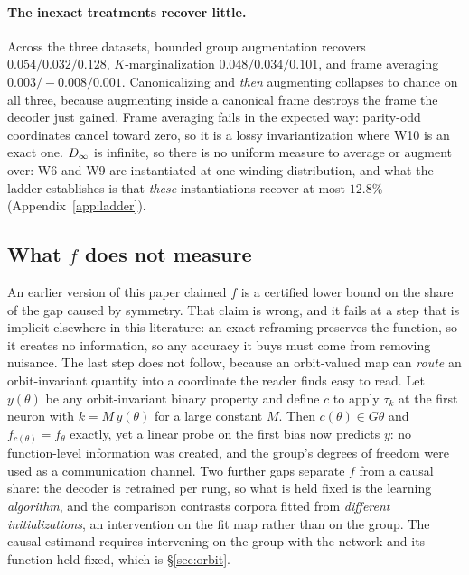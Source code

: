 \paragraph{The inexact treatments recover little.} Across the three datasets, bounded group
augmentation recovers $0.054 / 0.032 / 0.128$, $K$-marginalization $0.048 / 0.034 / 0.101$, and
frame averaging $0.003 / -0.008 / 0.001$. Canonicalizing and \emph{then} augmenting collapses to
chance on all three, because augmenting inside a canonical frame destroys the frame the decoder just
gained. Frame averaging fails in the expected way: parity-odd coordinates cancel toward zero, so it
is a lossy invariantization where W10 is an exact one. $D_\infty$ is infinite, so there is no uniform measure to average or augment over: W6 and W9 are
instantiated at one winding distribution, and what the ladder establishes is that \emph{these}
instantiations recover at most $12.8\%$ (Appendix~\ref{app:ladder}).

\subsection{What \texorpdfstring{$f$}{f} does not measure}\label{sec:bounds}

An earlier version of this paper claimed $f$ is a certified lower bound on the share of the gap
caused by symmetry. That claim is wrong, and it fails at a step that is implicit elsewhere in this
literature: an exact reframing preserves the function, so it creates no information, so any accuracy
it buys must come from removing nuisance. The last step does not follow, because an orbit-valued map
can \emph{route} an orbit-invariant quantity into a coordinate the reader finds easy to read. Let
$y(\theta)$ be any orbit-invariant binary property and define $c$ to apply $\tau_k$ at the first
neuron with $k = M\,y(\theta)$ for a large constant $M$. Then $c(\theta) \in G\theta$ and
$f_{c(\theta)} = f_\theta$ exactly, yet a linear probe on the first bias now predicts $y$: no
function-level information was created, and the group's degrees of freedom were used as a
communication channel. Two further gaps separate $f$ from a causal share: the decoder is retrained per rung, so what is
held fixed is the learning \emph{algorithm}, and the comparison contrasts corpora fitted from
\emph{different initializations}, an intervention on the fit map rather than on the group. The
causal estimand requires intervening on the group with the network and its function held fixed,
which is \S\ref{sec:orbit}.
